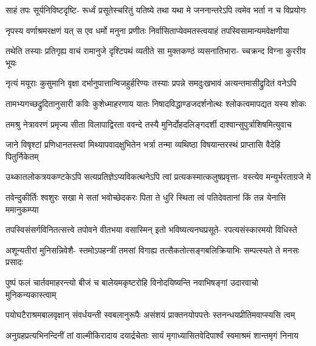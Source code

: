 \fourlineindentedshloka
{साहं तपः सूर्यनिविष्टदृष्टि-}
{रूर्ध्वं प्रसूतेस्चरितुं यतिष्ये}
{तथा यथा मे जननान्तरेऽपि}
{त्वमेव भर्ता न च विप्रयोगः} %

\fourlineindentedshloka
{नृपस्य वर्णाश्रमरक्षणं यत्}
{स एव धर्मो मनुना प्रणीतः}
{निर्वासिताप्येवमतस्त्वयाहं}
{तपस्विसामान्यमवेक्षणीया} %

\fourlineindentedshloka
{तथेति तस्याः प्रतिगृह्य वाचं}
{रामानुजे दृश्टिपथं व्यतीते}
{सा मुक्तकण्ठं व्यसनातिभारा-}
{च्चक्रन्द विग्ना कुररीव भूयः} %

\fourlineindentedshloka
{नृत्यं मयूराः कुसुमानि वृक्षा}
{दर्भानुपात्तान्विजहुर्हरिण्यः}
{तस्याः प्रपन्ने समदुःखभावं}
{अत्यन्तमासीद्रुदितं वनेऽपि} %

\fourlineindentedshloka
{तामभ्यगच्छद्रुदितानुसारी}
{कविः कुशेध्माहरणाय यातः}
{निषादविद्धाण्डजदर्शनोत्थः}
{श्लोकत्वमापद्यत यस्य शोकः} %

\fourlineindentedshloka
{तमश्रु नेत्रावरणं प्रमृज्य}
{सीता विलापाद्विरता ववन्दे}
{तस्यै मुनिर्दोहदलिङ्गदर्शी}
{दाश्वान्सुपुर्त्राशिषमित्युवाच} %

\fourlineindentedshloka
{जाने विषृश्टां प्रणिधानतस्त्वां}
{मिथ्यापवादक्षुभितेन भर्त्रा}
{तन्मा व्यथिष्ठा विषयान्तरस्थं}
{प्राप्तासि वैदेहि पितुर्निकेतम्} %

\fourlineindentedshloka
{उथ्कातलोकत्रयकण्टकेऽपि}
{सत्यप्रतिज्ञेऽप्यविकत्थनेऽपि}
{त्वां प्रत्यकस्मात्कलुषप्रवृत्ता-}
{वस्त्येव मन्युर्भरताग्रजे मे} %

\fourlineindentedshloka
{तवेन्दुकीर्तिः श्वशुरः सखा मे}
{सतां भवोच्छेदकरः पिता ते}
{धुरि स्थिता त्वं पतिदेवतानां}
{किं तन्न येनासि ममानुकम्प्या} %

\fourlineindentedshloka
{तपस्विसंसर्गविनितत्सत्त्वे}
{तपोवने वीतभया वसास्मिन्}
{इतो भविष्यत्यनघप्रसूते-}
{रपत्यसंस्कारमयो विधिस्ते} %

\fourlineindentedshloka
{अशून्यतीरां मुनिसन्निवेशै-}
{स्तमोऽपहन्त्रीं तमसां विगाह्य}
{तत्सैकतोत्सङ्गबलिक्रियाभिः}
{सम्पत्स्यते ते मनसः प्रसादः} %

\fourlineindentedshloka
{पुष्पं फलं चार्तवमाहरन्त्यो}
{बीजं च बालेयमकृष्टरोहि}
{विनोदयिष्यन्ति नवाभिषङ्गां}
{उदारवाचो मुनिकन्यकास्त्वाम्} %

\fourlineindentedshloka
{पयोघटैराश्रमबालवृक्षान्}
{संवर्धयन्ती स्वबलानुरूपैः}
{असंशयं प्राक्तनयोपपत्तेः}
{स्तनन्धयप्रीतिमवाप्स्यसि त्वम्} %

\fourlineindentedshloka
{अनुग्रहप्रत्यभिनन्दिनीं तां}
{वाल्मीकिरादाय दयार्द्रचेताः}
{सायं मृगाध्यासितवेदिपार्श्वं}
{स्वमाश्रमं शान्तमृगं निनाय} %

